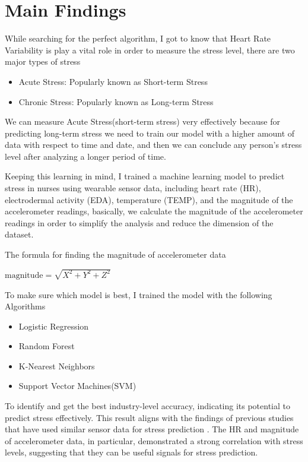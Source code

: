 \documentclass{article}
\begin{document}
\section{Main Findings}

\par While searching for the perfect algorithm, I got to know that Heart Rate Variability is play a vital role in order to measure the stress level\cite{7754331}, there are two major types of stress

\begin{itemize}
    \item Acute Stress: Popularly known as Short-term Stress
    \item Chronic Stress: Popularly known as Long-term Stress
\end{itemize}\cite{firbit5366}


We can measure Acute Stress(short-term stress) very effectively because for predicting long-term stress we need to train our model with a higher amount of data with respect to time and date, and then we can conclude any person's stress level after analyzing a longer period of time.

Keeping this learning in mind, I trained a machine learning model to predict stress in nurses using wearable sensor data, including heart rate (HR), electrodermal activity (EDA), temperature (TEMP), and the magnitude
of the accelerometer readings, basically, we calculate the magnitude of the accelerometer readings
in order to simplify the analysis and reduce the dimension of the dataset.

\noindent The formula for finding the magnitude of accelerometer data
\begin{center}
    $ 
    \text{magnitude} = \sqrt{X^2 + Y^2 + Z^2} \
    $
\end{center}

To make sure which model is best, I trained the model with the following Algorithms 

\begin{itemize}
    \item Logistic Regression
    \item Random Forest
    \item K-Nearest Neighbors
    \item Support Vector Machines(SVM)
\end{itemize}

To identify and get the best industry-level accuracy, indicating its potential to predict stress effectively. This result aligns with the findings of previous studies that have used similar sensor data for stress prediction\cite{stressmonitoring_iq3244} \cite{VOS2023105026} \cite{Modeling_the_Dynamics_of_Physiological}. The HR and magnitude of accelerometer data, in particular, demonstrated a strong correlation with stress levels, suggesting that they can be useful signals for stress prediction.
\end{document}
